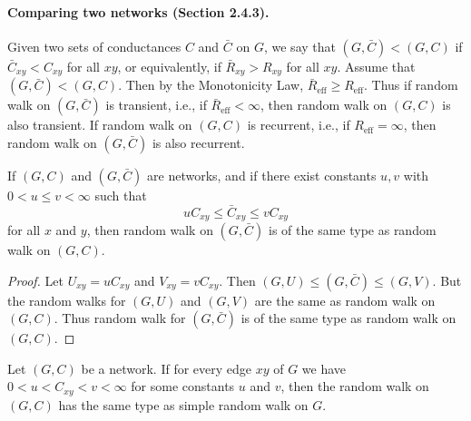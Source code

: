 \paragraph{Comparing two networks (Section 2.4.3).}
Given two sets of conductances $C$ and $\bar C$ on $G$, we say that $(G,\bar C)<(G,C)$ if $\bar C_{xy}<C_{xy}$ for all $xy$, or equivalently, if $\bar R_{xy}>R_{xy}$ for all $xy$. Assume that $(G,\bar C)<(G,C)$. Then by the Monotonicity Law, $\bar R_{\mathrm{eff}}\ge R_{\mathrm{eff}}$. Thus if random walk on $(G,\bar C)$ is transient, i.e., if $\bar R_{\mathrm{eff}}<\infty$, then random walk on $(G,C)$ is also transient. If random walk on $(G,C)$ is recurrent, i.e., if $R_{\mathrm{eff}}=\infty$, then random walk on $(G,\bar C)$ is also recurrent.
\begin{theorem}[Section 2.4.3]
If $(G,C)$ and $(G,\bar C)$ are networks, and if there exist constants $u,v$ with $0<u\le v<\infty$ such that
\[
uC_{xy}\le\bar C_{xy}\le vC_{xy}
\]
for all $x$ and $y$, then random walk on $(G,\bar C)$ is of the same type as random walk on $(G,C)$.
\end{theorem}
\begin{proof}
Let $U_{xy}=uC_{xy}$ and $V_{xy}=vC_{xy}$. Then $(G,U)\le(G,\bar C)\le(G,V)$. But the random walks for $(G,U)$ and $(G,V)$ are the same as random walk on $(G,C)$. Thus random walk for $(G,\bar C)$ is of the same type as random walk on $(G,C)$.
\end{proof}
\begin{corollary}[Section 2.4.3]
Let $(G,C)$ be a network. If for every edge $xy$ of $G$ we have $0<u<C_{xy}<v<\infty$ for some constants $u$ and $v$, then the random walk on $(G,C)$ has the same type as simple random walk on $G$.
\end{corollary}
